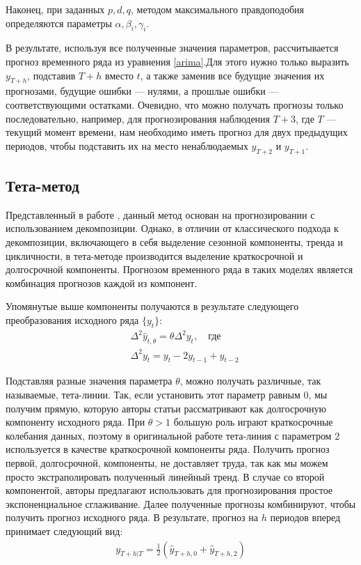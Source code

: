 Наконец, при заданных $p, d, q$, методом максимального правдоподобия определяются параметры $\alpha, \beta_i, \gamma_i$. 

В результате, используя все полученные значения параметров, рассчитывается прогноз временного ряда из уравнения \eqref{arima}.Для этого нужно только выразить $y_{T+h}$, подставив $T+h$ вместо $t$, а также заменив все будущие значения их прогнозами, будущие ошибки --- нулями, а прошлые ошибки --- соответствующими остатками. Очевидно, что можно получать прогнозы только последовательно, например, для прогнозирования наблюдения $T+3$, где $T$ --- текущий момент времени, нам необходимо иметь прогноз для двух предыдущих периодов, чтобы подставить их на место ненаблюдаемых $y_{T+2}$ и $y_{T+1}$.

\subsection{Тета-метод} \label{sec:teta}
Представленный в работе , данный метод основан на прогнозировании с использованием декомпозиции. Однако, в отличии от классического подхода к декомпозиции, включающего в себя выделение сезонной компоненты, тренда и цикличности, в тета-методе производится выделение краткосрочной и долгосрочной компоненты. Прогнозом временного ряда в таких моделях является комбинация прогнозов каждой из компонент.

Упомянутые выше компоненты получаются в результате следующего преобразования исходного ряда $\lbrace y_t\rbrace$:\\
\begin{align*}
&\Delta^2 \widehat{y}_{t,\theta} = \theta \Delta^2 y_t , \quad \text{где}\\
&\Delta^2 y_t = y_{t} - 2 y_{t-1} + y_{t-2}
\end{align*}

Подставляя разные значения параметра $\theta$, можно получать различные, так называемые, тета-линии. Так, если установить этот параметр равным 0, мы получим прямую, которую авторы статьи рассматривают как долгосрочную компоненту исходного ряда. При $\theta > 1$ большую роль играют краткосрочные колебания данных, поэтому в оригинальной работе тета-линия с параметром 2 используется в качестве краткосрочной компоненты ряда. Получить прогноз первой, долгосрочной, компоненты, не доставляет труда, так как мы можем просто экстраполировать полученный линейный тренд. В случае со второй компонентой, авторы предлагают использовать для прогнозирования простое экспоненциальное сглаживание. Далее полученные прогнозы комбинируют, чтобы получить прогноз исходного ряда. В результате, прогноз на $h$ периодов вперед принимает следующий вид:
\begin{align*}
y_{T+h|T} = \frac12 (\widehat{y}_{T+h, 0} + \widehat{y}_{T+h, 2})
\end{align*}


